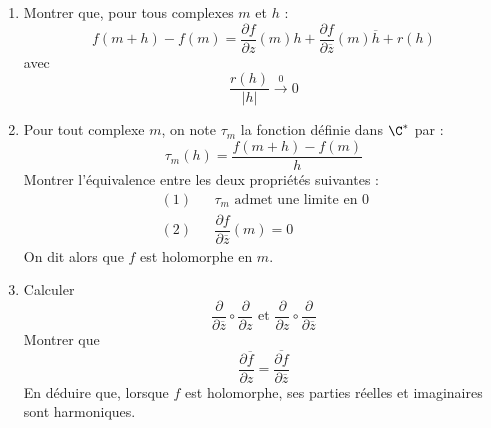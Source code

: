 \begin{enumerate}
 \item Montrer que, pour tous complexes $m$ et $h$ :
\begin{displaymath}
 f(m+h)-f(m) = \dfrac{\partial f}{\partial z}(m)h + \dfrac{\partial f}{\partial \overline{z}}(m)\overline{h} + r(h)
\end{displaymath}
avec 
\begin{displaymath}
 \dfrac{r(h)}{|h|} \xrightarrow{0} 0
\end{displaymath}
\item Pour tout complexe $m$, on note $\tau_m$ la fonction définie dans $\C^*$ par :
\begin{displaymath}
 \tau_m(h)=\dfrac{f(m+h)-f(m)}{h}
\end{displaymath}
Montrer l'équivalence entre les deux propriétés suivantes :
\begin{align*}
 &(1) & & \tau_m \text{ admet une limite en $0$ }\\
 &(2) & & \dfrac{\partial f}{\partial \overline{z}}(m) = 0
\end{align*}
On dit alors que $f$ est holomorphe en $m$.
\item Calculer
\begin{displaymath}
 \dfrac{\partial }{\partial \overline{z}}\circ \dfrac{\partial }{\partial z}
\text{ et }
\dfrac{\partial }{\partial z} \circ \dfrac{\partial }{\partial \overline{z}}
\end{displaymath}
Montrer que 
\begin{displaymath}
 \dfrac{\partial \overline{f}}{\partial z}
=
\overline{\dfrac{\partial f}{\partial \overline{z}}}
\end{displaymath}
En déduire que, lorsque $f$ est holomorphe, ses parties réelles et imaginaires sont harmoniques.
\end{enumerate}


